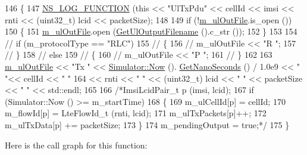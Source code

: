 \begin{DoxyCode}
146 \{
147   \hyperlink{log-macros-disabled_8h_a90b90d5bad1f39cb1b64923ea94c0761}{NS\_LOG\_FUNCTION} (\textcolor{keyword}{this} << \textcolor{stringliteral}{"UlTxPdu"} << cellId << imsi << rnti << (uint32\_t) lcid << 
      packetSize);
148 
149   \textcolor{keywordflow}{if} (!\hyperlink{classns3_1_1MmWaveBearerStatsCalculator_ab21257dfc9d424a270882b7f0b906f7c}{m\_ulOutFile}.is\_open ())
150   \{
151         \hyperlink{classns3_1_1MmWaveBearerStatsCalculator_ab21257dfc9d424a270882b7f0b906f7c}{m\_ulOutFile}.open (\hyperlink{classns3_1_1MmWaveBearerStatsCalculator_a12a6c9cb22f57948ef0cc2a53d8cac92}{GetUlOutputFilename} ().c\_str ());
152   \}
153 
154   \textcolor{comment}{// if (m\_protocolType == "RLC")}
155   \textcolor{comment}{// \{}
156   \textcolor{comment}{//    m\_ulOutFile << "R ";}
157   \textcolor{comment}{// \}}
158   \textcolor{comment}{// else}
159   \textcolor{comment}{// \{}
160   \textcolor{comment}{//    m\_ulOutFile << "P ";}
161   \textcolor{comment}{// \}}
162 
163   \hyperlink{classns3_1_1MmWaveBearerStatsCalculator_ab21257dfc9d424a270882b7f0b906f7c}{m\_ulOutFile} << \textcolor{stringliteral}{"Tx "} << \hyperlink{classns3_1_1Simulator_ac3178fa975b419f7875e7105be122800}{Simulator::Now} ().
      \hyperlink{classns3_1_1Time_a2fdb7bf0e1f5cd93b6149cb37bbb7f08}{GetNanoSeconds} () / 1.0e9 << \textcolor{stringliteral}{" "}<< cellId << \textcolor{stringliteral}{" "}
164                 << rnti << \textcolor{stringliteral}{" "} << (uint32\_t) lcid << \textcolor{stringliteral}{" "} << packetSize << \textcolor{stringliteral}{" "} << std::endl;
165 
166   \textcolor{comment}{/*ImsiLcidPair\_t p (imsi, lcid);}
167 \textcolor{comment}{  if (Simulator::Now () >= m\_startTime)}
168 \textcolor{comment}{    \{}
169 \textcolor{comment}{      m\_ulCellId[p] = cellId;}
170 \textcolor{comment}{      m\_flowId[p] = LteFlowId\_t (rnti, lcid);}
171 \textcolor{comment}{      m\_ulTxPackets[p]++;}
172 \textcolor{comment}{      m\_ulTxData[p] += packetSize;}
173 \textcolor{comment}{    \}}
174 \textcolor{comment}{  m\_pendingOutput = true;*/}
175 \}
\end{DoxyCode}


Here is the call graph for this function\+:


